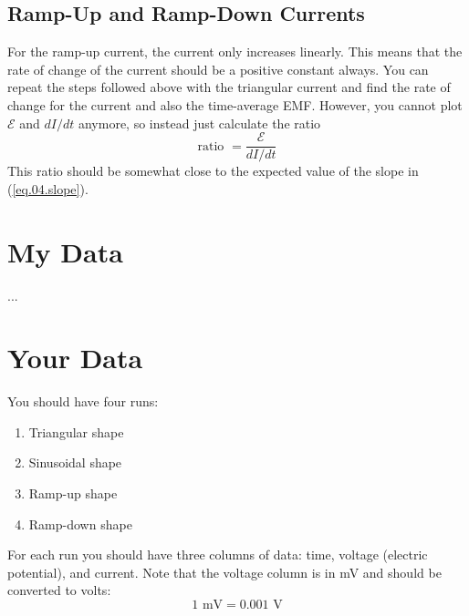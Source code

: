 \subsection{Ramp-Up and Ramp-Down Currents}
For the ramp-up current, the current only increases linearly. This means that the rate of change of the current should be a positive constant always. You can repeat the steps followed above with the triangular current and find the rate of change for the current and also the time-average EMF. However, you cannot plot $\mathcal{E}$ and $dI/dt$ anymore, so instead just calculate the ratio
\begin{equation}
	\text{ratio } = \frac{\mathcal{E}}{dI/dt}
\end{equation}
This ratio should be somewhat close to the expected value of the slope in (\ref{eq.04.slope}).
\section{My Data}
...
\section{Your Data}
You should have four runs:
\begin{enumerate}
	\item Triangular shape
	\item Sinusoidal shape
	\item Ramp-up shape
	\item Ramp-down shape
\end{enumerate}
For each run you should have three columns of data: time, voltage (electric potential), and current. Note that the voltage column is in mV and should be converted to volts:
\begin{equation}
	1 \text{ mV} = 0.001 \text{ V}
\end{equation}
\newpage
